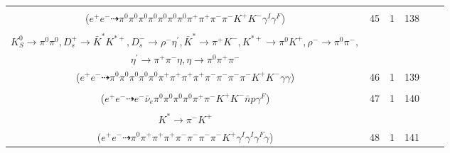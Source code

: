 \documentclass[landscape]{article}
\newcounter{rownumbers}
\newcommand\rn{\stepcounter{rownumbers}\arabic{rownumbers}}
\newcommand{\EOLP}{\\ \hline} %
\newcommand{\topoTags}[1]{#1} %
\begin{document}
\begin{longtable}{clcccc}
\rn & \makecell[l]{ $ 
e^{+} e^{-} \rightarrow \pi^{0} \pi^{0} \omega D^{*0} \bar{D}^{*0} \gamma^{I} ,
\omega \rightarrow \pi^{0} \pi^{+} \pi^{-} ,
D^{*0} \rightarrow \pi^{0} D^{0} ,
\bar{D}^{*0} \rightarrow \pi^{0} \bar{D}^{0} ,
D^{0} \rightarrow \pi^{0} \pi^{+} K^{-} \gamma^{F} ,
\bar{D}^{0} \rightarrow \pi^{0} \pi^{-} K^{+} 
$ \\ ($
e^{+} e^{-} \dashrightarrow \pi^{0} \pi^{0} \pi^{0} \pi^{0} \pi^{0} \pi^{0} \pi^{0} \pi^{+} \pi^{+} \pi^{-} \pi^{-} K^{+} K^{-} \gamma^{I} \gamma^{F} 
$) } & \topoTags{45 & }1 & 138 \EOLP

\rn & \makecell[l]{ $ 
e^{+} e^{-} \rightarrow K^{0} \bar{K}^{0} D_{s}^{*+} D_{s}^{*-} ,
K^{0} \rightarrow K_{S}^{0} ,
\bar{K}^{0} \rightarrow K_{S}^{0} ,
D_{s}^{*+} \rightarrow D_{s}^{+} \gamma ,
D_{s}^{*-} \rightarrow D_{s}^{-} \gamma ,
K_{S}^{0} \rightarrow \pi^{+} \pi^{-} ,
$ \\ $
K_{S}^{0} \rightarrow \pi^{0} \pi^{0} ,
D_{s}^{+} \rightarrow \bar{K}^{*} K^{*+} ,
D_{s}^{-} \rightarrow \rho^{-} \eta^{\prime} ,
\bar{K}^{*} \rightarrow \pi^{+} K^{-} ,
K^{*+} \rightarrow \pi^{0} K^{+} ,
\rho^{-} \rightarrow \pi^{0} \pi^{-} ,
$ \\ $
\eta^{\prime} \rightarrow \pi^{+} \pi^{-} \eta ,
\eta \rightarrow \pi^{0} \pi^{+} \pi^{-} 
$ \\ ($
e^{+} e^{-} \dashrightarrow \pi^{0} \pi^{0} \pi^{0} \pi^{0} \pi^{0} \pi^{+} \pi^{+} \pi^{+} \pi^{+} \pi^{-} \pi^{-} \pi^{-} \pi^{-} K^{+} K^{-} \gamma \gamma 
$) } & \topoTags{46 & }1 & 139 \EOLP

\rn & \makecell[l]{ $ 
e^{+} e^{-} \rightarrow \eta D_{2}^{*-} \bar{n} \Lambda_{c}^{+} ,
\eta \rightarrow \pi^{0} \pi^{0} \pi^{0} ,
D_{2}^{*-} \rightarrow \pi^{0} D^{-} ,
\Lambda_{c}^{+} \rightarrow \pi^{+} K^{-} p ,
D^{-} \rightarrow e^{-} \bar{\nu}_{e} K^{*} ,
K^{*} \rightarrow \pi^{-} K^{+} \gamma^{F} 
$ \\ ($
e^{+} e^{-} \dashrightarrow e^{-} \bar{\nu}_{e} \pi^{0} \pi^{0} \pi^{0} \pi^{0} \pi^{+} \pi^{-} K^{+} K^{-} \bar{n} p \gamma^{F} 
$) } & \topoTags{47 & }1 & 140 \EOLP

\rn & \makecell[l]{ $ 
e^{+} e^{-} \rightarrow \pi^{+} \pi^{-} D^{0} \bar{D}^{*0} \gamma^{I} \gamma^{I} ,
D^{0} \rightarrow \pi^{0} K_{S}^{0} ,
\bar{D}^{*0} \rightarrow \bar{D}^{0} \gamma ,
K_{S}^{0} \rightarrow \pi^{+} \pi^{-} ,
\bar{D}^{0} \rightarrow \pi^{-} K_1^{+} ,
K_1^{+} \rightarrow \pi^{+} K^{*} \gamma^{F} ,
$ \\ $
K^{*} \rightarrow \pi^{-} K^{+} 
$ \\ ($
e^{+} e^{-} \dashrightarrow \pi^{0} \pi^{+} \pi^{+} \pi^{+} \pi^{-} \pi^{-} \pi^{-} \pi^{-} K^{+} \gamma^{I} \gamma^{I} \gamma^{F} \gamma 
$) } & \topoTags{48 & }1 & 141 \EOLP


\end{longtable}
\end{document}
